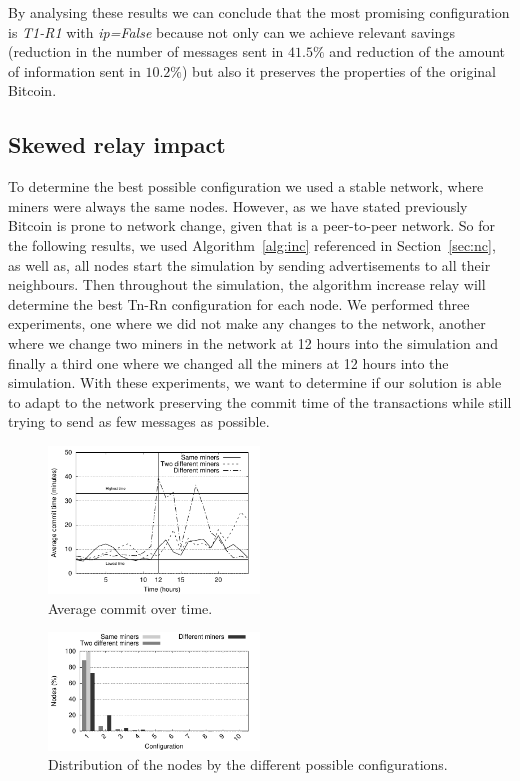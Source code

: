 \documentclass{dads}   %
\begin{document}
By analysing these results we can conclude that the most promising configuration is \textsl{T1-R1} with \textsl{ip=False} because not only can we achieve relevant savings (reduction in the number of messages sent in $41.5\%$ and reduction of the amount of information sent in $10.2\%$) but also it preserves the properties of the original Bitcoin.

\subsection{Skewed relay impact}
To determine the best possible configuration we used a stable network, where miners were always the same nodes. However, as we have stated previously Bitcoin is prone to network change, given that is a peer-to-peer network. So for the following results, we used Algorithm~\ref{alg:inc} referenced in Section~\ref{sec:nc}, as well as, all nodes start the simulation by sending advertisements to all their neighbours. Then throughout the simulation, the algorithm increase relay will determine the best Tn-Rn configuration for each node. We performed three experiments, one where we did not make any changes to the network, another where we change two miners in the network at 12 hours into the simulation and finally a third one where we changed all the miners at 12 hours into the simulation. With these experiments, we want to determine if our solution is able to adapt to the network preserving the commit time of the transactions while still trying to send as few messages as possible.

\begin{figure}[t]
\centering
\includegraphics[width=0.5\textwidth]{plots/commit_over_time.pdf}
\caption{Average commit over time.}
\label{fig:commit-over-time}
\end{figure}

\begin{figure}[t]
\centering
\includegraphics[width=0.5\textwidth]{plots/nodes_per_config.pdf}
\caption{Distribution of the nodes by the different possible configurations.}
\label{fig:node-per-conf}
\end{figure}
\end{document}
